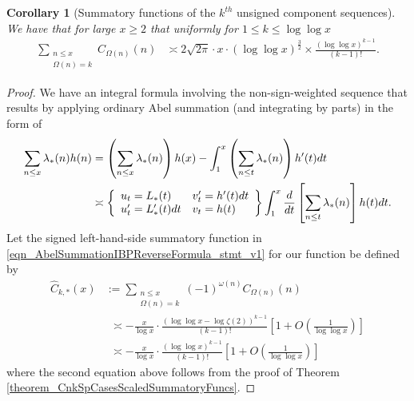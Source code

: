 \documentclass[11pt,reqno,a4letter]{article}
\numberwithin{figure}{section}
\numberwithin{table}{section}
\theoremstyle{plain}
\newtheorem{cor}[theorem]{Corollary}
\numberwithin{theorem}{section}
\theoremstyle{definition}
\begin{document}
\begin{cor}[Summatory functions of the $k^{th}$ unsigned component sequences] 
\label{cor_SummatoryFuncsOfUnsignedSeqs_v2} 
We have that for large $x \geq 2$ that uniformly for $1 \leq k \leq \log\log x$ 
\begin{align*} 
\sum_{\substack{n \leq x \\ \Omega(n) = k}} C_{\Omega(n)}(n) & \asymp 
     2\sqrt{2\pi} \cdot x \cdot (\log\log x)^{\frac{3}{2}} \times 
     \frac{(\log\log x)^{k-1}}{(k-1)!}. 
\end{align*} 
\end{cor} 
\begin{proof} 
We have an integral formula involving the non-sign-weighted 
sequence that results by 
applying ordinary Abel summation (and integrating by parts) in the form of 
\begin{align} 
\label{eqn_AbelSummationIBPReverseFormula_stmt_v1} 
\sum_{n \leq x} \lambda_{\ast}(n) h(n) & = \left(\sum_{n \leq x} \lambda_{\ast}(n)\right) h(x) - 
     \int_{1}^{x} \left(\sum_{n \leq t} \lambda_{\ast}(n)\right) h^{\prime}(t) dt \\ 
\notag 
     & \asymp \left\{\begin{array}{ll} 
     u_t = L_{\ast}(t) & v_t^{\prime} = h^{\prime}(t) dt \\ 
     u_t^{\prime} = L_{\ast}^{\prime}(t) dt & v_t = h(t) 
     \end{array} 
     \right\} 
     \int_1^{x} \frac{d}{dt}\left[\sum_{n \leq t} \lambda_{\ast}(n)\right] h(t) dt. 
\end{align} 
Let the signed left-hand-side summatory function in 
\eqref{eqn_AbelSummationIBPReverseFormula_stmt_v1} for our function be defined by 
\begin{align*} 
\widehat{C}_{k,\ast}(x) & := \sum_{\substack{n \leq x \\ \Omega(n)=k}} 
     (-1)^{\omega(n)} C_{\Omega(n)}(n) \\ 
     & \phantom{:} \asymp  
     -\frac{x}{\log x} \cdot \frac{(\log\log x - \log\zeta(2))^{k-1}}{(k-1)!} \left[ 
     1 + O\left(\frac{1}{\log\log x}\right)\right] \\ 
     & \phantom{:} \asymp 
     -\frac{x}{\log x} \cdot \frac{(\log\log x)^{k-1}}{(k-1)!} \left[ 
     1 + O\left(\frac{1}{\log\log x}\right)\right]
\end{align*} 
where the second equation above follows from the proof of 
Theorem \ref{theorem_CnkSpCasesScaledSummatoryFuncs}. 


\end{proof}
\end{document}
